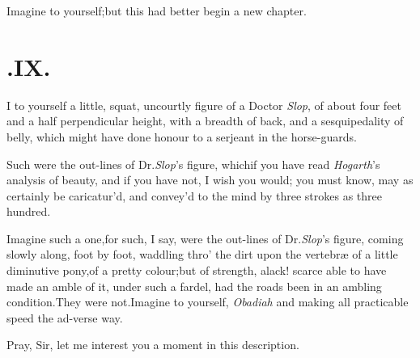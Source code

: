 \documentclass{article}
\begin{document}
Imagine to yourself;\tsk but this had better begin a new
chapter.


\section{.\enspace  IX.}

\lettrine{I}{} to yourself a little, squat, uncourtly figure of a Doctor
\textit{Slop}, of\break
about four feet and a half perpendicular
height, with a breadth of back, and a sesqui\-pedality of belly, which might have done honour to a serjeant in
the horse-guards.

Such were the out-lines of Dr.\@ \textit{Slop}’s figure, which\tsk if you have read
\textit{Ho\-garth}’s analysis of beauty, and if you have not, I wish you would;\tsh
you must know, may as certainly be caricatur’d, and convey’d to the mind by three
strokes as three hundred.

Imagine such a one,\tsk for such, I say, were the out-lines of
Dr.\@ \textit{Slop}’s figure, coming slowly along, foot by foot,
waddling thro’ the dirt upon the vertebræ of a little
diminutive pony,\tsk of a pretty colour;\tsk but of strength,\tsk
alack!\tsh\break
scarce able to have made an amble of it,\break
under such a fardel, had the roads been
in an ambling condition.\tsh They were not.\tsh Imagine
to yourself, \textit{Obadiah}
and making all practicable speed the ad-\break verse way.

Pray, Sir, let me interest you a moment in this description.
\end{document}
